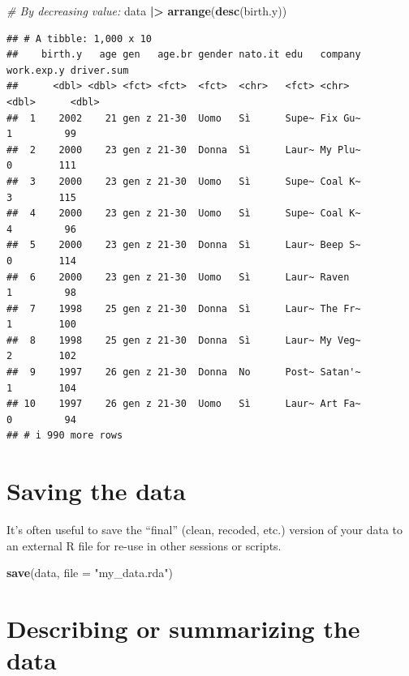 \documentclass[
]{book}
\newenvironment{Shaded}{\begin{snugshade}}{\end{snugshade}}
\newcommand{\AttributeTok}[1]{\textcolor[rgb]{0.13,0.29,0.53}{#1}}
\newcommand{\CommentTok}[1]{\textcolor[rgb]{0.56,0.35,0.01}{\textit{#1}}}
\newcommand{\FunctionTok}[1]{\textcolor[rgb]{0.13,0.29,0.53}{\textbf{#1}}}
\newcommand{\NormalTok}[1]{#1}
\newcommand{\SpecialCharTok}[1]{\textcolor[rgb]{0.81,0.36,0.00}{\textbf{#1}}}
\newcommand{\StringTok}[1]{\textcolor[rgb]{0.31,0.60,0.02}{#1}}
\begin{document}
\begin{Shaded}
\begin{Highlighting}[]
\CommentTok{\# By decreasing value:}
\NormalTok{data }\SpecialCharTok{|\textgreater{}} 
  \FunctionTok{arrange}\NormalTok{(}\FunctionTok{desc}\NormalTok{(birth.y))}
\end{Highlighting}
\end{Shaded}

\begin{verbatim}
## # A tibble: 1,000 x 10
##    birth.y   age gen   age.br gender nato.it edu   company work.exp.y driver.sum
##      <dbl> <dbl> <fct> <fct>  <fct>  <chr>   <fct> <chr>        <dbl>      <dbl>
##  1    2002    21 gen z 21-30  Uomo   Sì      Supe~ Fix Gu~          1         99
##  2    2000    23 gen z 21-30  Donna  Sì      Laur~ My Plu~          0        111
##  3    2000    23 gen z 21-30  Uomo   Sì      Supe~ Coal K~          3        115
##  4    2000    23 gen z 21-30  Uomo   Sì      Supe~ Coal K~          4         96
##  5    2000    23 gen z 21-30  Donna  Sì      Laur~ Beep S~          0        114
##  6    2000    23 gen z 21-30  Uomo   Sì      Laur~ Raven            1         98
##  7    1998    25 gen z 21-30  Donna  Sì      Laur~ The Fr~          1        100
##  8    1998    25 gen z 21-30  Donna  Sì      Laur~ My Veg~          2        102
##  9    1997    26 gen z 21-30  Donna  No      Post~ Satan'~          1        104
## 10    1997    26 gen z 21-30  Uomo   Sì      Laur~ Art Fa~          0         94
## # i 990 more rows
\end{verbatim}

\hypertarget{saving-the-data}{%
\section{Saving the data}\label{saving-the-data}}

It's often useful to save the ``final'' (clean, recoded, etc.) version of your data to an external R file for re-use in other sessions or scripts.

\begin{Shaded}
\begin{Highlighting}[]
\FunctionTok{save}\NormalTok{(data, }\AttributeTok{file =} \StringTok{"my\_data.rda"}\NormalTok{)}
\end{Highlighting}
\end{Shaded}

\hypertarget{describing-or-summarizing-the-data}{%
\section{Describing or summarizing the data}\label{describing-or-summarizing-the-data}}
\end{document}
